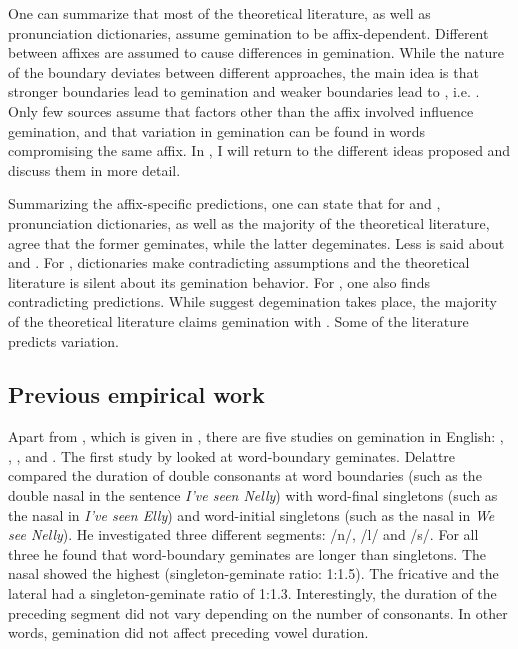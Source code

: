  
One can summarize that most of the theoretical literature, as well as pronunciation dictionaries, assume gemination to be affix-dependent. Different  between affixes are assumed to cause differences in gemination. While the nature of the boundary deviates between different approaches, the main idea is that stronger boundaries lead to gemination and weaker boundaries lead to , i.e. . Only few sources assume that factors other than the affix involved influence gemination, and that variation in gemination can be found in words compromising the same affix.  In , I will return to the different ideas proposed and discuss them in more detail. 

Summarizing the affix-specific predictions, one can state that for  and , pronunciation dictionaries, as well as the majority of the theoretical literature, agree that the former geminates, while the latter {degeminates}. Less is said about  and . For , dictionaries make contradicting assumptions and the theoretical literature is silent about its gemination behavior. For , one also finds contradicting predictions. While \cite{Wells.2008} suggest {degemination} takes place, the majority of the theoretical literature claims gemination with . Some of the literature predicts variation. 

\subsection{Previous empirical work}\label{previous empirical work}

Apart from \cite{BenHedia.2017}, which is given in , there are five studies on gemination in English: \cite{Delattre.}, \cite{Kaye.2005}, \cite{Oh.2012}, \cite{Oh.2013}   and \cite{Kotzor.2016}.   %
The first study by \cite{Delattre.} looked at word-boundary geminates. Delattre compared the duration of double consonants at word boundaries (such as the double nasal  in the sentence \textit{I've seen Nelly}) with word-final singletons (such as the nasal in \textit{I've seen Elly}) and word-initial singletons (such as the nasal in \textit{We see Nelly}). He investigated three different segments: /n/, /l/ and /s/. For all three he found that word-boundary geminates are longer than singletons. The nasal showed the highest  (singleton-geminate ratio: 1:1.5). The fricative and the lateral had a singleton-geminate ratio of 1:1.3. Interestingly, the duration of the preceding segment did not vary depending on the number of consonants. In other words, gemination did not affect preceding vowel duration.

